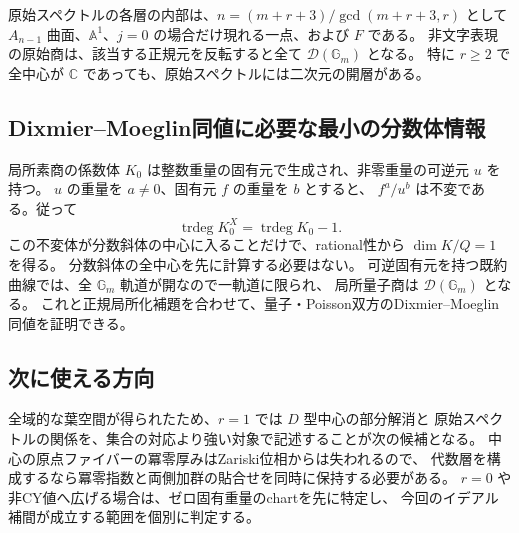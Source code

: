 原始スペクトルの各層の内部は、$n=(m+r+3)/\gcd(m+r+3,r)$ として
$A_{n-1}$ 曲面、$\mathbb A^1$、$j=0$ の場合だけ現れる一点、および $F$ である。
非文字表現の原始商は、該当する正規元を反転すると全て $\mathcal D(\mathbb G_m)$ となる。
特に $r\ge2$ で全中心が $\mathbb C$ であっても、原始スペクトルには二次元の開層がある。

\subsection{Dixmier--Moeglin同値に必要な最小の分数体情報}

局所素商の係数体 $K_0$ は整数重量の固有元で生成され、非零重量の可逆元 $u$ を持つ。
$u$ の重量を $a\ne0$、固有元 $f$ の重量を $b$ とすると、
$f^a/u^b$ は不変である。従って
\[
 \operatorname{trdeg}K_0^X=\operatorname{trdeg}K_0-1.
\]
この不変体が分数斜体の中心に入ることだけで、rational性から $\dim K/Q=1$ を得る。
分数斜体の全中心を先に計算する必要はない。
可逆固有元を持つ既約曲線では、全 $\mathbb G_m$ 軌道が開なので一軌道に限られ、
局所量子商は $\mathcal D(\mathbb G_m)$ となる。
これと正規局所化補題を合わせて、量子・Poisson双方のDixmier--Moeglin同値を証明できる。

\subsection{次に使える方向}

全域的な葉空間が得られたため、$r=1$ では $D$ 型中心の部分解消と
原始スペクトルの関係を、集合の対応より強い対象で記述することが次の候補となる。
中心の原点ファイバーの冪零厚みはZariski位相からは失われるので、
代数層を構成するなら冪零指数と両側加群の貼合せを同時に保持する必要がある。
$r=0$ や非CY値へ広げる場合は、ゼロ固有重量のchartを先に特定し、
今回のイデアル補間が成立する範囲を個別に判定する。
